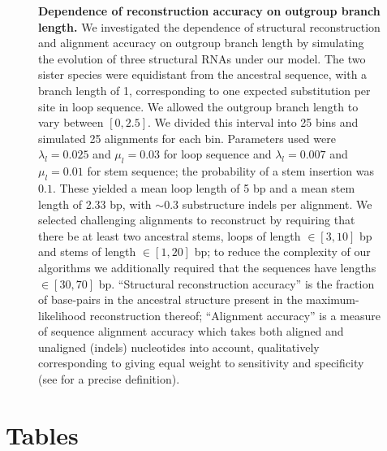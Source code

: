 \documentclass[10pt]{article}
\begin{document}
\begin{figure}[!ht]
  \centering
  \caption{
    \textbf{Dependence of reconstruction accuracy on outgroup branch
      length.}
    We investigated the dependence of structural reconstruction and
    alignment accuracy on outgroup branch length by simulating the
    evolution of three structural RNAs under our model.  The two
    sister species were equidistant from the ancestral sequence, with
    a branch length of 1, corresponding to one expected
    substitution per site in loop sequence.  We allowed the outgroup
    branch length to vary between $[0, 2.5]$.  We divided this interval
    into 25 bins and simulated 25 alignments for each bin.
    Parameters used were $\lambda_l = 0.025$ and $\mu_l = 0.03$ for
    loop sequence and $\lambda_l = 0.007$ and $\mu_l = 0.01$ for stem
    sequence; the probability of a stem insertion was $0.1$.  These
    yielded a mean loop length of 5 bp and a mean stem length of 2.33 bp,
    with $\sim 0.3$ substructure indels per alignment.
    We selected challenging alignments to reconstruct by requiring
    that there be at least two ancestral stems, loops of length $\in [3,
    10]$ bp and stems of length $\in [1, 20]$ bp; to reduce the complexity of
    our algorithms we additionally required that the sequences have
    lengths $\in [30, 70]$ bp.
    ``Structural reconstruction accuracy'' is the fraction of
    base-pairs in the ancestral structure present in the
    maximum-likelihood reconstruction thereof; ``Alignment accuracy''
    is a measure of sequence alignment accuracy which takes both
    aligned and unaligned (indels) nucleotides into account,
    qualitatively corresponding to giving equal weight to sensitivity
    and specificity (see
    \cite{SchwartzMyersPachter2006} for a precise definition).
}
\end{figure}


\clearpage
\section*{Tables}
\end{document}
